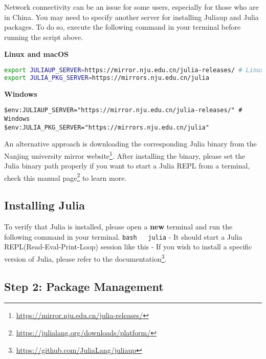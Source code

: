 \documentclass[
  notoc %
]{tufte-book}
\DeclareRobustCommand{\href}[2]{#2\footnote{\url{#1}}}
\newcommand{\passthrough}[1]{#1}
\begin{document}
Network connectivity can be an issue for some users, especially for
those who are in China. You may need to specify another server for
installing Juliaup and Julia packages. To do so, execute the following
command in your terminal before running the script above.

\textbf{Linux and macOS}

\begin{lstlisting}[language=bash]
export JULIAUP_SERVER=https://mirror.nju.edu.cn/julia-releases/ # Linux & macOS
export JULIA_PKG_SERVER=https://mirrors.nju.edu.cn/julia
\end{lstlisting}

\textbf{Windows}

\begin{lstlisting}
$env:JULIAUP_SERVER="https://mirror.nju.edu.cn/julia-releases/" # Windows
$env:JULIA_PKG_SERVER="https://mirrors.nju.edu.cn/julia"
\end{lstlisting}

An alternative approach is downloading the corresponding Julia binary
from the \href{https://mirror.nju.edu.cn/julia-releases/}{Nanjing
university mirror website}. After installing the binary, please set the
Julia binary path properly if you want to start a Julia REPL from a
terminal, check this
\href{https://julialang.org/downloads/platform/}{manual page} to learn
more.

\hypertarget{installing-julia}{%
\subsection{Installing Julia}\label{installing-julia}}

To verify that Julia is installed, please open a \textbf{new} terminal
and run the following command in your terminal.
\passthrough{\lstinline!bash   julia!} - It should start a Julia
REPL(Read-Eval-Print-Loop) session like this - If you wish to install a
specific version of Julia, please refer to the
\href{https://github.com/JuliaLang/juliaup}{documentation}.

\hypertarget{step-2-package-management}{%
\subsection{Step 2: Package
Management}\label{step-2-package-management}}
\end{document}
